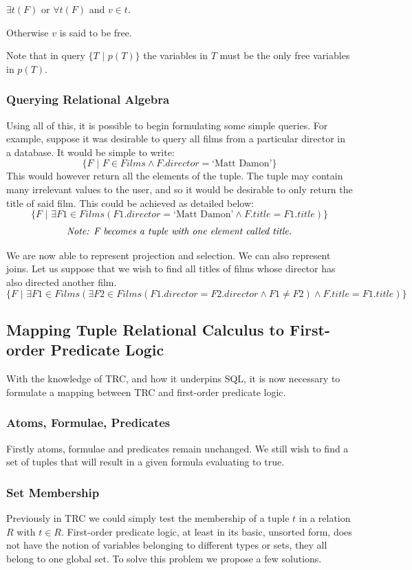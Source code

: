 \documentclass[a4paper, 11pt]{article}
\begin{document}
      $\exists t(F)$ or $\forall t(F)$ and $v \in t$.

      Otherwise $v$ is said to be free.

      Note that in query $\{T\text{ | }p(T)\}$ the variables in $T$ must be the only
      free variables in $p(T)$.

    \subsubsection{Querying Relational Algebra}
      Using all of this, it is possible to begin formulating some simple
      queries. For example, suppose it was desirable to query all films from a
      particular director in a database. It would be simple to write:
      $$ \{F\text{ | }F \in Films \land F.director = \text{`Matt Damon'}\} $$
      This would however return all the elements of the tuple. The tuple may
      contain many irrelevant values to the user, and so it would be desirable
      to only return the title of said film. This could be achieved as detailed
      below:
      $$ \{F\text{ | } \exists F1 \in Films(F1.director = \text{`Matt Damon'}
           \land F.title = F1.title)\} $$
      $$ \emph{Note: F becomes a tuple with one element called title.} $$

      We are now able to represent projection and selection. We can also
      represent joins. Let us suppose that we wish to find all titles of films
      whose director has also directed another film.
      $$ \{F\text{ | }\exists F1 \in Films(\exists F2 \in Films(F1.director =
           F2.director \land F1 \neq F2) \land F.title = F1.title)\} $$

  \subsection{Mapping Tuple Relational Calculus to First-order Predicate Logic}
    \label{sec:tuplefo}
    With the knowledge of TRC, and how it underpins SQL, it is now necessary to
    formulate a mapping between TRC and first-order predicate logic.

    \subsubsection{Atoms, Formulae, Predicates}
      Firstly atoms, formulae and predicates remain unchanged. We still wish to
      find a set of tuples that will result in a given formula evaluating to
      true.

    \subsubsection{Set Membership}
      Previously in TRC we could simply test the membership of a tuple $t$ in a
      relation $R$ with $t \in R$. First-order predicate logic, at least in its
      basic, unsorted form, does not have the notion of variables belonging to
      different types or sets, they all belong to one global set. To solve this
      problem we propose a few solutions.
\end{document}

